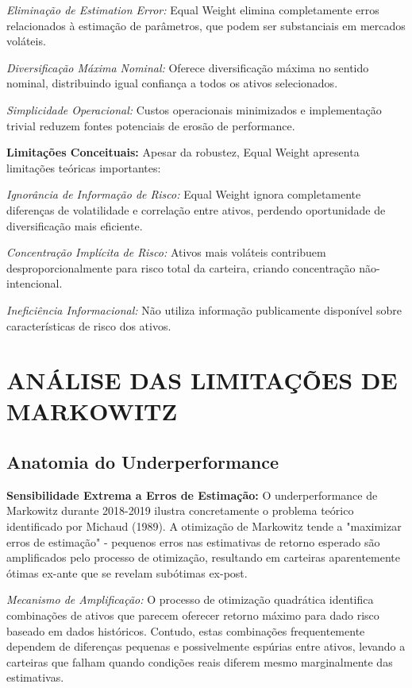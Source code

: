 \textit{Eliminação de Estimation Error:} Equal Weight elimina completamente erros relacionados à estimação de parâmetros, que podem ser substanciais em mercados voláteis.

\textit{Diversificação Máxima Nominal:} Oferece diversificação máxima no sentido nominal, distribuindo igual confiança a todos os ativos selecionados.

\textit{Simplicidade Operacional:} Custos operacionais minimizados e implementação trivial reduzem fontes potenciais de erosão de performance.

\textbf{Limitações Conceituais:} Apesar da robustez, Equal Weight apresenta limitações teóricas importantes:

\textit{Ignorância de Informação de Risco:} Equal Weight ignora completamente diferenças de volatilidade e correlação entre ativos, perdendo oportunidade de diversificação mais eficiente.

\textit{Concentração Implícita de Risco:} Ativos mais voláteis contribuem desproporcionalmente para risco total da carteira, criando concentração não-intencional.

\textit{Ineficiência Informacional:} Não utiliza informação publicamente disponível sobre características de risco dos ativos.

\section{ANÁLISE DAS LIMITAÇÕES DE MARKOWITZ}

\subsection{Anatomia do Underperformance}

\textbf{Sensibilidade Extrema a Erros de Estimação:} O underperformance de Markowitz durante 2018-2019 ilustra concretamente o problema teórico identificado por Michaud (1989). A otimização de Markowitz tende a "maximizar erros de estimação" - pequenos erros nas estimativas de retorno esperado são amplificados pelo processo de otimização, resultando em carteiras aparentemente ótimas ex-ante que se revelam subótimas ex-post.

\textit{Mecanismo de Amplificação:} O processo de otimização quadrática identifica combinações de ativos que parecem oferecer retorno máximo para dado risco baseado em dados históricos. Contudo, estas combinações frequentemente dependem de diferenças pequenas e possivelmente espúrias entre ativos, levando a carteiras que falham quando condições reais diferem mesmo marginalmente das estimativas.

